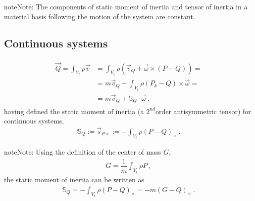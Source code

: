 \documentclass[letterpaper,10pt,english]{jupyterBook}
\begin{document}
\begin{sphinxadmonition}{note}{Note:}
\sphinxAtStartPar
The components of static moment of inertia and tensor of inertia in a material basis \sphinxhyphen{} following the motion of the system \sphinxhyphen{} are constant.
\end{sphinxadmonition}


\subsection{Continuous systems}
\label{\detokenize{ch/inertia:id1}}
\sphinxAtStartPar
{}
\begin{equation*}
\begin{split}\begin{aligned}
  \vec{Q} = \int_{V_t} \rho \vec{v}
  & = \int_{V_t} \rho \left( \vec{v}_Q + \vec{\omega} \times (P - Q) \right) = \\
  & = m \vec{v}_Q - \int_{V_t} \rho (P_k - Q) \times \vec{\omega} = \\
  & = m \vec{v}_Q + \mathbb{S}_Q \cdot \vec{\omega} \ ,
\end{aligned}\end{split}
\end{equation*}
\sphinxAtStartPar
having defined the static moment of inertia (a \(2^{nd}\)\sphinxhyphen{}order antisymmetric tensor) for continuous systems,
\begin{equation*}
\begin{split}\mathbb{S}_Q := \vec{s}_{P \times} := - \int_{V_t} \rho (P - Q)_{\times} \ .\end{split}
\end{equation*}
\begin{sphinxadmonition}{note}{Note:}
\sphinxAtStartPar
Using the definition of the center of mass \(G\),
\begin{equation*}
\begin{split}G = \dfrac{1}{m} \int_{V_t} \rho P \ ,\end{split}
\end{equation*}
\sphinxAtStartPar
the static moment of inertia can be written as
\begin{equation*}
\begin{split}\mathbb{S}_Q = - \int_{V_t} \rho (P-Q)_{\times} = - m (G - Q)_{\times} \ .\end{split}
\end{equation*}\end{sphinxadmonition}
\end{document}

